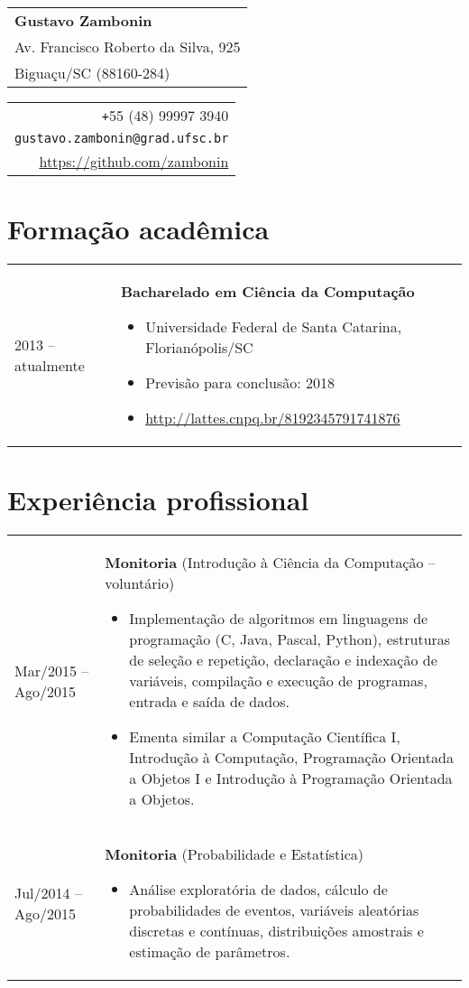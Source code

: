 \documentclass{article}
\newenvironment{contenttable}[1]{
    \section*{#1}
    \newcolumntype{L}{>{\bf \raggedleft}p{0.13\textwidth}}
    \newcolumntype{R}{p{0.82\textwidth}}
    \begin{tabular}{L!{\color{lightgray} \vrule}R}
}{
    \end{tabular}
}
\newenvironment{smallitem}{
    \vspace{-2mm}
    \begin{itemize}
    \setlength{\parskip}{0pt}
    \setlength{\itemsep}{2pt}
}{
    \vspace{-2mm}
    \end{itemize}
}
\begin{document}
\begin{tabular}{@{\hspace{-5mm}}l}
    {\Large \textbf{Gustavo Zambonin}} \\
    Av. Francisco Roberto da Silva, 925 \\
    Biguaçu/SC (88160-284)
\end{tabular}
\hfill
\begin{tabular}{r}
    \verb!+!55 (48) 99997 3940 \\
    \verb!gustavo.zambonin@grad.ufsc.br! \\
    \url{https://github.com/zambonin}
\end{tabular}

\begin{contenttable}{Formação acadêmica}
    2013 -- atualmente & \textbf{Bacharelado em Ciência da Computação}
    \begin{smallitem}
        \item Universidade Federal de Santa Catarina, Florianópolis/SC
        \item Previsão para conclusão: 2018
        \item \url{http://lattes.cnpq.br/8192345791741876}
    \end{smallitem}
\end{contenttable}

\begin{contenttable}{Experiência profissional}
    Mar/2015 -- Ago/2015 & \textbf{Monitoria} (Introdução à Ciência da
        Computação -- voluntário)
    \begin{smallitem}
        \item Implementação de algoritmos em linguagens de programação (C,
        Java, Pascal, Python), estruturas de seleção e repetição, declaração e
        indexação de variáveis, compilação e execução de programas, entrada e
        saída de dados.
        \item Ementa similar a Computação Científica I, Introdução à
        Computação, Programação Orientada a Objetos I e Introdução à
        Programação Orientada a Objetos.
    \end{smallitem} \\

    Jul/2014 -- Ago/2015 & \textbf{Monitoria} (Probabilidade e Estatística)
    \begin{smallitem}
        \item Análise exploratória de dados, cálculo de probabilidades de
        eventos, variáveis aleatórias discretas e contínuas, distribuições
        amostrais e estimação de parâmetros.
    \end{smallitem}
\end{contenttable}
\end{document}
